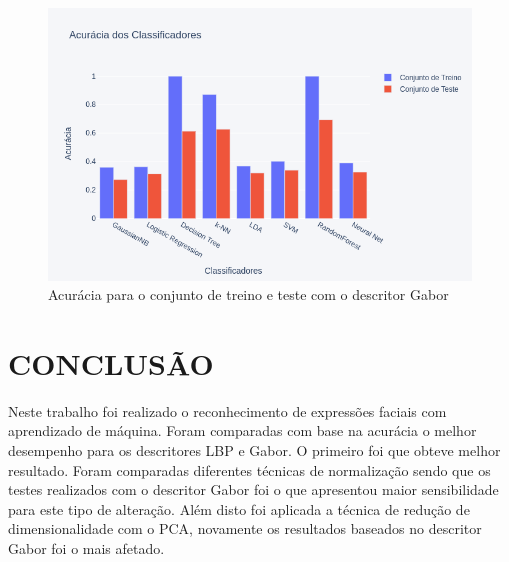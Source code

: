 \documentclass[a4paper, 12 pt, conference]{ieeeconf}  %
\begin{document}
\begin{figure}[!htbp]
	\centering
	\includegraphics[width=1.0\linewidth,clip=true,trim=0cm 0cm 0cm 0cm, keepaspectratio=true]{bar_result_gabor.png}
	\caption{Acurácia para o conjunto de treino e teste com o descritor Gabor}
	\label{fig:bar_result_gabor}
\end{figure}
\section{CONCLUSÃO}

Neste trabalho foi realizado o reconhecimento de expressões faciais com aprendizado de máquina. Foram comparadas com base na acurácia o melhor desempenho para os descritores LBP e Gabor. O primeiro foi que obteve melhor resultado. Foram comparadas diferentes técnicas de normalização sendo que os testes realizados com o descritor Gabor foi o que apresentou maior sensibilidade para este tipo de alteração. Além disto foi aplicada a técnica de redução de dimensionalidade com o PCA, novamente os resultados baseados no descritor Gabor foi o mais afetado.



\end{document}
